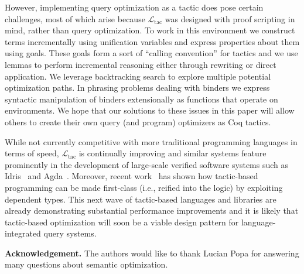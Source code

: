 \documentclass[preprint]{sigplanconf}
\newcommand{\ltac}[0]{\ensuremath{\mathcal{L}_{\mathrm{tac}}}}
\begin{document}
However, implementing query optimization as a tactic does pose certain challenges, most of which arise because \ltac{} was designed with proof scripting in mind, rather than query optimization.
To work in this environment we construct terms incrementally using unification variables and express properties about them using goals.
These goals form a sort of ``calling convention'' for tactics and we use lemmas to perform incremental reasoning either through rewriting or direct application.
We leverage backtracking search to explore multiple potential optimization paths.
In phrasing problems dealing with binders we express syntactic manipulation of binders extensionally as functions that operate on environments.
We hope that our solutions to these issues in this paper will allow others to create their own query (and program) optimizers as Coq tactics.

While not currently competitive with more traditional programming languages in terms of speed, \ltac{} is continually improving and similar systems feature prominently in the development of large-scale verified software systems such as Idris~\cite{brady2013idris} and Agda~\cite{agda}.  Moreover, recent work~\cite{malecha2015thesis,devriese2013tsmp,vanderwalt2013engineering-reflection-agda} has shown how tactic-based programming can be made first-class (i.e., reified into the logic) by exploiting dependent types.
This next wave of tactic-based languages and libraries are already demonstrating substantial performance improvements and it is likely that tactic-based optimization will soon be a viable design pattern for language-integrated query systems.






{\bf Acknowledgement.}  The authors would like to thank Lucian Popa for answering many questions about semantic optimization.



\end{document}
